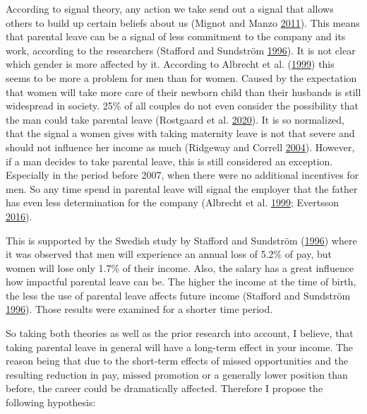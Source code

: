 \documentclass[
  12pt,
]{article}
\begin{document}
According to signal theory, any action we take send out a signal that allows others to build up certain beliefs about us (Mignot and Manzo \protect\hyperlink{ref-mignot_peter_2011}{2011}). This means that parental leave can be a signal of less commitment to the company and its work, according to the researchers (Stafford and Sundström \protect\hyperlink{ref-stafford_time_1996}{1996}). It is not clear which gender is more affected by it. According to Albrecht et al. (\protect\hyperlink{ref-albrecht_career_1999}{1999}) this seems to be more a problem for men than for women. Caused by the expectation that women will take more care of their newborn child than their husbands is still widespread in society. 25\% of all couples do not even consider the possibility that the man could take parental leave (Rostgaard et al. \protect\hyperlink{ref-rostgaard_parental_2020}{2020}). It is so normalized, that the signal a women gives with taking maternity leave is not that severe and should not influence her income as much (Ridgeway and Correll \protect\hyperlink{ref-ridgeway_unpacking_2004}{2004}). However, if a man decides to take parental leave, this is still considered an exception. Especially in the period before 2007, when there were no additional incentives for men. So any time spend in parental leave will signal the employer that the father has even less determination for the company (Albrecht et al. \protect\hyperlink{ref-albrecht_career_1999}{1999}; Evertsson \protect\hyperlink{ref-evertsson_parental_2016}{2016}).

This is supported by the Swedish study by Stafford and Sundström (\protect\hyperlink{ref-stafford_time_1996}{1996}) where it was observed that men will experience an annual loss of 5.2\% of pay, but women will lose only 1.7\% of their income. Also, the salary has a great influence how impactful parental leave can be. The higher the income at the time of birth, the less the use of parental leave affects future income (Stafford and Sundström \protect\hyperlink{ref-stafford_time_1996}{1996}). Those results were examined for a shorter time period.

So taking both theories as well as the prior research into account, I believe, that taking parental leave in general will have a long-term effect in your income. The reason being that due to the short-term effects of missed opportunities and the resulting reduction in pay, missed promotion or a generally lower position than before, the career could be dramatically affected.
Therefore I propose the following hypothesis:
\end{document}
